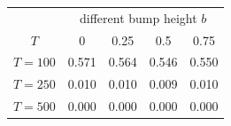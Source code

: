 \begin{tabular}{ccccc}
\hline
  & \multicolumn{4}{c}{different bump height $b$} \\
 $T$ & 0 & 0.25 & 0.5 & 0.75 \\
 \hline
$T = 100$ & 0.571 & 0.564 & 0.546 & 0.550 \\ 
  $T = 250$ & 0.010 & 0.010 & 0.009 & 0.010 \\ 
  $T = 500$ & 0.000 & 0.000 & 0.000 & 0.000 \\ 
   \hline
\end{tabular}
